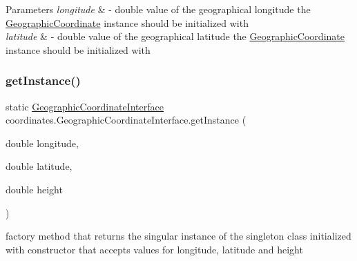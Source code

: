 \begin{DoxyParams}{Parameters}
{\em longitude} & -\/ double value of the geographical longitude the \hyperlink{classcoordinates_1_1_geographic_coordinate}{Geographic\+Coordinate} instance should be initialized with \\
\hline
{\em latitude} & -\/ double value of the geographical latitude the \hyperlink{classcoordinates_1_1_geographic_coordinate}{Geographic\+Coordinate} instance should be initialized with \\
\hline
\end{DoxyParams}
\mbox{\label{classcoordinates_1_1_geographic_coordinate_interface_a38627aff97345b4ae6c87e37e8a5e406}} 
\subsubsection{\texorpdfstring{get\+Instance()}{getInstance()}\hspace{0.1cm}{\footnotesize\ttfamily [3/3]}}
{\footnotesize\ttfamily static \hyperlink{classcoordinates_1_1_geographic_coordinate_interface}{Geographic\+Coordinate\+Interface} coordinates.\+Geographic\+Coordinate\+Interface.\+get\+Instance (\begin{DoxyParamCaption}\item[{double}]{longitude,  }\item[{double}]{latitude,  }\item[{double}]{height }\end{DoxyParamCaption})\hspace{0.3cm}{\ttfamily [static]}}



factory method that returns the singular instance of the singleton class initialized with constructor that accepts values for longitude, latitude and height 


